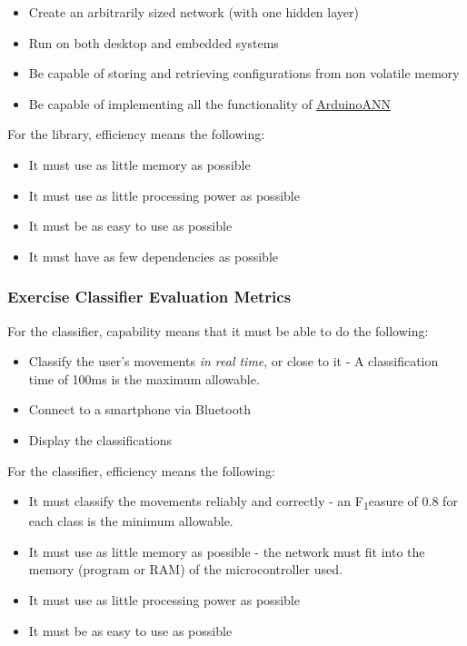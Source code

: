 \documentclass[a4paper]{article}
\begin{document}
\begin{itemize}
\item Create an arbitrarily sized network (with one hidden layer)
\item Run on both desktop and embedded systems
\item Be capable of storing and retrieving configurations from non volatile memory
\item Be capable of implementing all the functionality of \hyperref[subsec:bg_arduinoann]{ArduinoANN}
\end{itemize}

For the library, efficiency means the following:
\begin{itemize}
\item It must use as little memory as possible
\item It must use as little processing power as possible
\item It must be as easy to use as possible
\item It must have as few dependencies as possible
\end{itemize}

\subsubsection{Exercise Classifier Evaluation Metrics}
\label{subsubsec:in_cs_ecmetrics}

For the classifier, capability means that it must be able to do the following:

\begin{itemize}
\item Classify the user's movements \textit{in real time}, or close to it - A classification time of 100ms is the maximum allowable.
\item Connect to a smartphone via Bluetooth
\item Display the classifications
\end{itemize}

For the classifier, efficiency means the following:

\begin{itemize}
\item It must classify the movements reliably and correctly - an F\texorpdfstring{\textsubscript{1}} measure of 0.8 for each class is the minimum allowable.
\item It must use as little memory as possible - the network must fit into the memory (program or RAM) of the microcontroller used.
\item It must use as little processing power as possible
\item It must be as easy to use as possible
\end{itemize}
\end{document}
